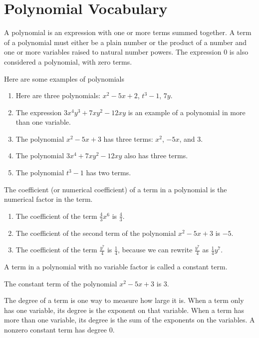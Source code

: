 \documentclass{ximera}
\begin{document}
\section{Polynomial Vocabulary}
       A polynomial is an expression with one or more
          terms summed together.
          A term of a polynomial must either be a plain number
          or the product of a number and one or more variables raised to natural number powers.
          The expression $0$ is also considered a polynomial,
          with zero terms.
\begin{example}
Here are some examples of polynomials
\begin{enumerate}
   \item  Here are three polynomials: 
$x^2-5x+2$, $t^3-1$, $7y$.
        \item The expression $3x^4y^3+7xy^2-12xy$ is an example of a polynomial in more than one variable.
    \item   The polynomial $x^2-5x+3$ has three terms:
              $x^2$, $-5x$, and $3$.
\item The polynomial $ 3x^4+7xy^2-12xy$ also has three terms.
\item The polynomial $t^3-1$ has two terms.
\end{enumerate}
\end{example}
\begin{definition}
The coefficient
          (or numerical coefficient)
          of a term in a polynomial is the numerical factor in the term.
\end{definition}
\begin{example}
\begin{enumerate}
   \item  The coefficient of the term
              $\frac{4}{3}x^6$ is $\frac{4}{3}$.
\item   The coefficient of the second term of the polynomial $x^2-5x+3$ is $-5$.
       \item The coefficient of the term
              $\frac{y^7}{4}$ is $\frac{1}{4}$, because we can rewrite $\frac{y^7}{4}$ as $\frac{1}{4}y^7$.
\end{enumerate}
\end{example}
 A term in a polynomial with no variable factor is called a
          constant term.
\begin{example}
   The constant term of the polynomial $x^2-5x+3$ is $3$.
\end{example}
\begin{definition}
      The degree of a term is one way to measure how large it is.
          When a term only has one variable,
          its degree is the exponent on that variable.
          When a term has more than one variable,
          its degree is the sum of the exponents on the variables.
          A nonzero constant term has degree $0$.
\end{definition}
\end{document}
